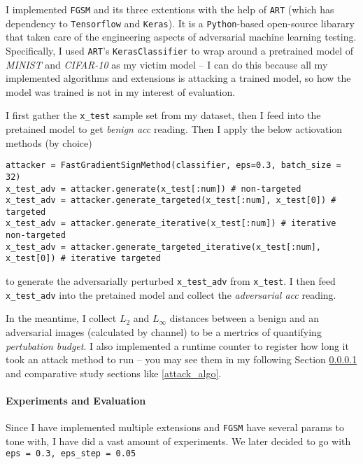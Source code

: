 \documentclass[11pt]{article}
\newcommand{\ilc}{\texttt}
\begin{document}
I implemented \ilc{FGSM} and its three extentions with the help of \ilc{ART}\cite{cite:art} (which has dependency to \ilc{Tensorflow} and \ilc{Keras}). It is a \ilc{Python}-based open-source libarary that taken care of the engineering aspects of adversarial machine learning testing. Specifically, I used \ilc{ART}'s \ilc{KerasClassifier} to wrap around a pretrained model of \textit{MINIST} and \textit{CIFAR-10} as my victim model -- I can do this because all my implemented algorithms and extensions is attacking a trained model, so how the model was trained is not in my interest of evaluation.\newline

I first gather the \ilc{x\_test} sample set from my dataset, then I feed into the pretained model to get \textit{benign acc} reading. Then I apply the below actiovation methods (by choice)

\begin{lstlisting}
attacker = FastGradientSignMethod(classifier, eps=0.3, batch_size = 32)
x_test_adv = attacker.generate(x_test[:num]) # non-targeted
x_test_adv = attacker.generate_targeted(x_test[:num], x_test[0]) # targeted
x_test_adv = attacker.generate_iterative(x_test[:num]) # iterative non-targeted
x_test_adv = attacker.generate_targeted_iterative(x_test[:num], x_test[0]) # iterative targeted
\end{lstlisting}

to generate the adversarially perturbed \ilc{x\_test\_adv} from \ilc{x\_test}. I then feed \ilc{x\_test\_adv} into the pretained model and collect the \textit{adversarial acc} reading.

In the meantime, I collect $L_2$ and $L_\infty$ distances between a benign and an adversarial images (calculated by channel) to be a mertrics of quantifying \textit{pertubation budget}. I also implemented a runtime counter to register how long it took an attack method to run -- you may see them in my following Section \ref{fgsm_exp} and comparative study sections like \ref{attack_algo}.

\paragraph{Experiments and Evaluation}\label{fgsm_exp}

Since I have implemented multiple extensions and \ilc{FGSM} have several params to tone with, I have did a vast amount of experiments. We later decided to go with \ilc{eps = 0.3, eps\_step = 0.05}
\end{document}
